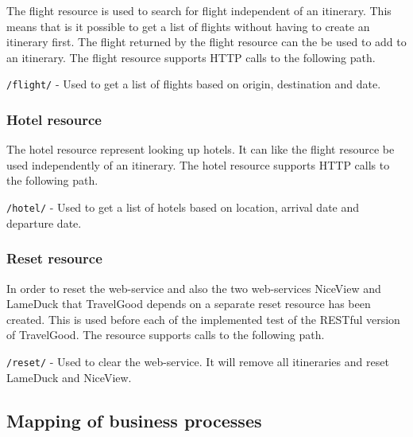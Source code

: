 \noindent
The flight resource is used to search for flight independent of an itinerary. This means that is it possible to get a list of flights without having to create an itinerary first. The flight returned by the flight resource can the be used to add to an itinerary. The flight resource supports HTTP calls to the following path.
\begin{description}
	\item \texttt{/flight/} - Used to get a list of flights based on origin, destination and date.
\end{description}

\subsubsection{Hotel resource}
\mkt

\noindent
The hotel resource represent looking up hotels. It can like the flight resource be used independently of an itinerary. The hotel resource supports HTTP calls to the following path.
\begin{description}
	\item \texttt{/hotel/} - Used to get a list of hotels based on location, arrival date and departure date.
\end{description}

\subsubsection{Reset resource}
\pet

\noindent
In order to reset the web-service and also the two web-services NiceView and LameDuck that TravelGood depends on a separate reset resource has been created. This is used before each of the implemented test of the RESTful version of TravelGood. The resource supports calls to the following path.
\begin{description}
	\item \texttt{/reset/} - Used to clear the web-service. It will remove all itineraries and reset LameDuck and NiceView.
\end{description}

\subsection{Mapping of business processes}
\pet

